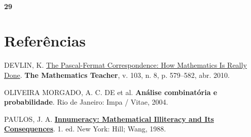 \documentclass[
  11pt]{report}
\newlength{\cslhangindent}
\newlength{\cslentryspacingunit} %
\newenvironment{CSLReferences}[2] %
 {%
  \setlength{\parindent}{0pt}
  \ifodd #1
  \let\oldpar\par
  \def\par{\hangindent=\cslhangindent\oldpar}
  \fi
  \setlength{\parskip}{#2\cslentryspacingunit}
 }%
 {}
\begin{document}
\hypertarget{section-17}{%
\subsubsection*{29}\label{section-17}}

\hypertarget{referuxeancias}{%
\chapter*{Referências}\label{referuxeancias}}

\hypertarget{refs}{}
\begin{CSLReferences}{0}{1}
\leavevmode{}%
DEVLIN, K. \href{https://doi.org/10.5951/mt.103.8.0579}{The {P}ascal-{F}ermat Correspondence: How Mathematics Is Really Done}. \textbf{The Mathematics Teacher}, v. 103, n. 8, p. 579--582, abr. 2010.

\leavevmode{}%
OLIVEIRA MORGADO, A. C. DE et al. \textbf{An{á}lise combinat{ó}ria e probabilidade}. Rio de Janeiro: Impa / Vitae, 2004.

\leavevmode{}%
PAULOS, J. A. \textbf{\href{http://gen.lib.rus.ec/book/index.php?md5=20A842C0E7EB7F8992EDDA0082E9B76F}{Innumeracy: Mathematical Illiteracy and Its Consequences}}. 1. ed. New York: Hill; Wang, 1988.

\end{CSLReferences}
\end{document}
